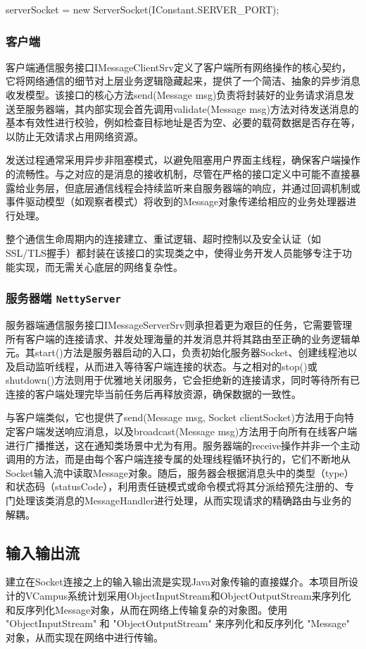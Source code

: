 serverSocket = new ServerSocket(IConstant.SERVER_PORT);


\subsubsection{客户端}
客户端通信服务接口IMessageClientSrv定义了客户端所有网络操作的核心契约，它将网络通信的细节对上层业务逻辑隐藏起来，提供了一个简洁、抽象的异步消息收发模型。该接口的核心方法send(Message msg)负责将封装好的业务请求消息发送至服务器端，其内部实现会首先调用validate(Message msg)方法对待发送消息的基本有效性进行校验，例如检查目标地址是否为空、必要的载荷数据是否存在等，以防止无效请求占用网络资源。

发送过程通常采用异步非阻塞模式，以避免阻塞用户界面主线程，确保客户端操作的流畅性。与之对应的是消息的接收机制，尽管在严格的接口定义中可能不直接暴露给业务层，但底层通信线程会持续监听来自服务器端的响应，并通过回调机制或事件驱动模型（如观察者模式）将收到的Message对象传递给相应的业务处理器进行处理。

整个通信生命周期内的连接建立、重试逻辑、超时控制以及安全认证（如SSL/TLS握手）都封装在该接口的实现类之中，使得业务开发人员能够专注于功能实现，而无需关心底层的网络复杂性。
\subsubsection{服务器端 \texttt{NettyServer}}
服务器端通信服务接口IMessageServerSrv则承担着更为艰巨的任务，它需要管理所有客户端的连接请求、并发处理海量的并发消息并将其路由至正确的业务逻辑单元。其start()方法是服务器启动的入口，负责初始化服务器Socket、创建线程池以及启动监听线程，从而进入等待客户端连接的状态。与之相对的stop()或shutdown()方法则用于优雅地关闭服务，它会拒绝新的连接请求，同时等待所有已连接的客户端处理完毕当前任务后再释放资源，确保数据的一致性。

与客户端类似，它也提供了send(Message msg, Socket clientSocket)方法用于向特定客户端发送响应消息，以及broadcast(Message msg)方法用于向所有在线客户端进行广播推送，这在通知类场景中尤为有用。服务器端的receive操作并非一个主动调用的方法，而是由每个客户端连接专属的处理线程循环执行的，它们不断地从Socket输入流中读取Message对象。随后，服务器会根据消息头中的类型（type）和状态码（statusCode），利用责任链模式或命令模式将其分派给预先注册的、专门处理该类消息的MessageHandler进行处理，从而实现请求的精确路由与业务的解耦。
\subsection{输入输出流}
建立在Socket连接之上的输入输出流是实现Java对象传输的直接媒介。本项目所设计的VCampus系统计划采用ObjectInputStream和ObjectOutputStream来序列化和反序列化Message对象，从而在网络上传输复杂的对象图。使用 "ObjectInputStream" 和 "ObjectOutputStream" 来序列化和反序列化 "Message" 对象，从而实现在网络中进行传输。
